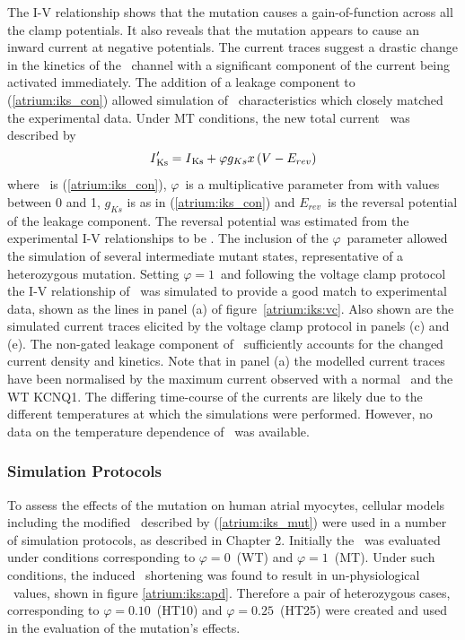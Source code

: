 The I-V relationship shows that the mutation causes a gain-of-function across
all the clamp potentials.
It also reveals that the mutation appears to cause an inward current at negative
potentials.
The current traces suggest a drastic change in the kinetics of the \
channel with a significant component of the current being activated immediately.
The addition of a leakage component to (\ref{atrium:iks_con}) allowed simulation
of \ii{Ks}\ characteristics which closely matched the experimental data.
Under MT conditions, the new total current \iip{Ks}\ was described by
\begin{equation}
\label{atrium:iks_mut}
\text{\emph{I}}'_{\text{Ks}} = \text{\emph{I}}_{\text{Ks}} + \varphi g_{Ks}x\left(V-E_{rev}\right)
\end{equation}
where \ is (\ref{atrium:iks_con}), $\varphi$\ is a multiplicative parameter
from with values between 0 and 1, $g_{Ks}$ is as in (\ref{atrium:iks_con}) and
$E_{rev}$\ is the reversal potential of the leakage component.
The reversal potential was estimated from the experimental I-V relationships to be
\mv{-76.3}.
The inclusion of the $\varphi$\ parameter allowed the simulation of several
intermediate mutant states, representative of a heterozygous mutation.
Setting $\varphi = 1$\ and following the voltage clamp protocol the I-V relationship of \ was simulated to
provide a good match to experimental data, shown as the lines in panel (a) of
figure~\ref{atrium:iks:vc}.
Also shown are the simulated current traces elicited by the voltage clamp
protocol in panels (c) and (e).
The non-gated leakage component of \ sufficiently accounts for the
changed current density and kinetics.
Note that in panel (a) the modelled current traces have been normalised by the
maximum current observed with a normal \ii{Ks}\ and the WT KCNQ1.
The differing time-course of the currents are likely due to the different temperatures
at which the simulations were performed.
However, no data on the temperature dependence of \ was available.

\subsubsection{Simulation Protocols}
\label{sec:atrium:s140g:methods}
To assess the effects of the mutation on human atrial myocytes, cellular models
including the modified \iip{Ks}\ described by (\ref{atrium:iks_mut}) were used
in a number of simulation protocols, as described in Chapter 2.
Initially the \apd\ was evaluated under conditions corresponding to $\varphi =
0$\ (WT) and $\varphi = 1$\ (MT).
Under such conditions, the induced \apd\ shortening was found to result in
un-physiological \apd\ values, shown in figure \ref{atrium:iks:apd}.
Therefore a pair of heterozygous cases, corresponding to $\varphi = 0.10$\
(HT10) and $\varphi = 0.25$\ (HT25) were created and used in the evaluation of
the mutation's effects.

